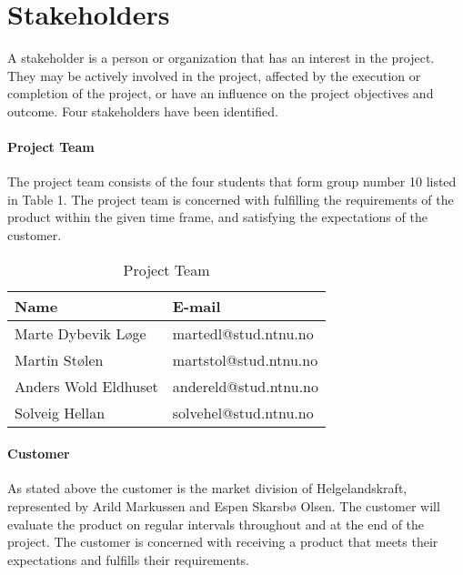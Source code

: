 \section{Stakeholders}

A stakeholder is a person or organization that has an interest in the project. They may be actively involved in the project, affected by the execution or completion of the project, or have an influence on the project objectives and outcome. Four stakeholders have been identified.

\paragraph{Project Team}

The project team consists of the four students that form group number 10 listed in Table 1. The project team is concerned with fulfilling the requirements of the product within the given time frame, and satisfying the expectations of the customer.


\begin{table}[H]
\begin{center}
    \begin{tabular}{| l | l |}
   	\hline
    \rowcolor{gray}
    {\bf Name} & {\bf E-mail} \\ \hline
    Marte Dybevik Løge & martedl@stud.ntnu.no \\ \hline
    Martin Stølen & martstol@stud.ntnu.no \\ \hline
    Anders Wold Eldhuset & andereld@stud.ntnu.no \\ \hline
    Solveig Hellan & solvehel@stud.ntnu.no \\ 
    \hline
    \end{tabular}
\end{center}

\caption{Project Team}
\end{table}

\paragraph{Customer}

As stated above the customer is the market division of Helgelandskraft, represented by Arild Markussen and Espen Skarsbø Olsen. The customer will evaluate the product on regular intervals throughout and at the end of the project. The customer is concerned with receiving a product that meets their expectations and fulfills their requirements.

